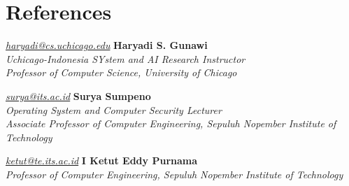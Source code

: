 \section{References}
\begin{twocolentry}{
    \textit{\href{mailto:haryadi@cs.uchicago.edu}{haryadi@cs.uchicago.edu}}
}
\textbf{Haryadi S. Gunawi}\\
\textit{Uchicago-Indonesia SYstem and AI Research Instructor\\
    Professor of Computer Science, University of Chicago
}\\
\end{twocolentry}

\vspace{0.2 cm}

\begin{twocolentry}{
    \textit{\href{mailto:surya@its.ac.id}{surya@its.ac.id}}
}
\textbf{Surya Sumpeno}\\
\textit{Operating System and Computer Security Lecturer\\Associate Professor of Computer Engineering, Sepuluh Nopember Institute of Technology}\\
\end{twocolentry}

\vspace{0.2 cm}

\begin{twocolentry}{
    \textit{\href{mailto:ketut@te.its.ac.id}{ketut@te.its.ac.id}}
}
\textbf{I Ketut Eddy Purnama}\\
\textit{Professor of Computer Engineering, Sepuluh Nopember Institute of Technology}\\
\end{twocolentry}
